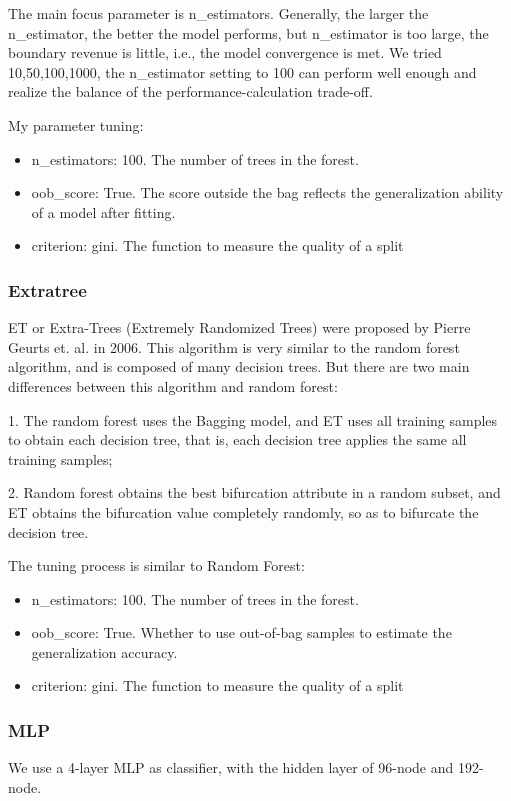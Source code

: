 \documentclass[11pt,en]{elegantpaper}
\begin{document}
The main focus parameter is n\_estimators. Generally, the larger the n\_estimator, the better the model performs, but n\_estimator is too large, the boundary revenue is little, i.e., the model convergence is met. We tried 10,50,100,1000, the n\_estimator setting to 100 can perform well enough and realize the balance of the performance-calculation trade-off.

My parameter tuning:
\begin{itemize}
	\item n\_estimators: 100. The number of trees in the forest.
	\item oob\_score: True. The score outside the bag reflects the generalization ability of a model after fitting. 
	\item criterion: gini. The function to measure the quality of a split
\end{itemize}

\subsubsection{Extratree}
ET or Extra-Trees (Extremely Randomized Trees) were proposed by Pierre Geurts et. al. in 2006\cite{geurts2006kernelizing}. This algorithm is very similar to the random forest algorithm, and is composed of many decision trees. But there are two main differences between this algorithm and random forest:

1. The random forest uses the Bagging model, and ET uses all training samples to obtain each decision tree, that is, each decision tree applies the same all training samples;

2. Random forest obtains the best bifurcation attribute in a random subset, and ET obtains the bifurcation value completely randomly, so as to bifurcate the decision tree.

The tuning process is similar to Random Forest:
\begin{itemize}
	\item n\_estimators: 100. The number of trees in the forest.
	\item oob\_score: True. Whether to use out-of-bag samples to estimate the generalization accuracy.
	\item criterion: gini. The function to measure the quality of a split
\end{itemize}

\subsubsection{MLP}
We use a 4-layer MLP as classifier, with the hidden layer of 96-node and 192-node.
\end{document}
